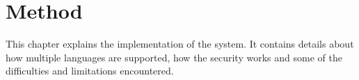 \chapter{Method}
This chapter explains the implementation of the system. It contains details about how multiple languages are supported, how the security works and some of the difficulties and limitations encountered.







